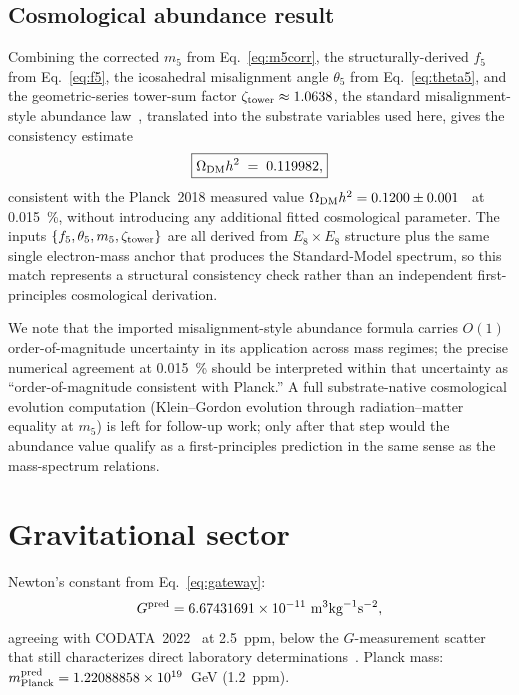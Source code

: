 ﻿\documentclass[reprint,amsmath,amssymb,aps,prd,longbibliography,floatfix]{revtex4-2}
\begin{document}
\subsection{Cosmological abundance result}

Combining the corrected $m_5$ from Eq.~\eqref{eq:m5corr}, the
structurally-derived $f_5$ from Eq.~\eqref{eq:f5}, the icosahedral
misalignment angle $\theta_5$ from Eq.~\eqref{eq:theta5}, and the
geometric-series tower-sum factor $\zeta_{\rm tower} \approx 1.0638$,
the standard misalignment-style abundance law~\cite{KimCarosi2010},
translated into the
substrate variables used here, gives the consistency estimate
\begin{equation}
\boxed{\Omega_{\rm DM} h^2 \;=\; 0.119982,}
\label{eq:OmegaDMresult}
\end{equation}
consistent with the Planck~2018 measured value
$\Omega_{\rm DM} h^2 = 0.1200 \pm 0.001$~\cite{Planck2018} at
\SI{0.015}{\percent}, without introducing any additional fitted
cosmological parameter. The inputs $\{f_5, \theta_5, m_5, \zeta_{\rm tower}\}$
are all derived from $E_8 \times E_8$ structure plus the same single
electron-mass anchor that produces the Standard-Model spectrum, so this
match represents a structural consistency check rather than an
independent first-principles cosmological derivation.

We note that the imported misalignment-style abundance formula carries
$O(1)$
order-of-magnitude uncertainty in its application across mass regimes;
the precise numerical agreement at \SI{0.015}{\percent} should be
interpreted within that uncertainty as ``order-of-magnitude consistent
with Planck.'' A full substrate-native cosmological evolution
computation (Klein--Gordon evolution through radiation--matter equality
at $m_5$) is left for follow-up work; only after that step would the
abundance value qualify as a first-principles prediction in the same
sense as the mass-spectrum relations.

\section{Gravitational sector}
\label{sec:gravity}

Newton's constant from Eq.~\eqref{eq:gateway}:
\begin{equation}
G^{\rm pred} = 6.67431691 \times 10^{-11}~\text{m}^3\text{kg}^{-1}\text{s}^{-2},
\end{equation}
agreeing with CODATA~2022~\cite{CODATA2022} at \SI{2.5}{ppm}, below the
$G$-measurement scatter that still characterizes direct laboratory
determinations~\cite{GReview2017}. Planck mass:
$m_{\rm Planck}^{\rm pred} = 1.22088858 \times 10^{19}$~GeV (\SI{1.2}{ppm}).
\end{document}

